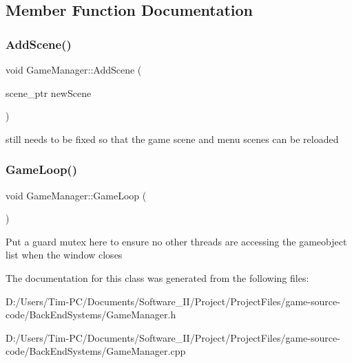 \subsection{Member Function Documentation}
\mbox{\label{class_game_manager_a65e593032333cee8723ad08ebfe897fc}} 
\subsubsection{\texorpdfstring{Add\+Scene()}{AddScene()}}
{\footnotesize\ttfamily void Game\+Manager\+::\+Add\+Scene (\begin{DoxyParamCaption}\item[{scene\+\_\+ptr}]{new\+Scene }\end{DoxyParamCaption})}

still needs to be fixed so that the game scene and menu scenes can be reloaded \mbox{\label{class_game_manager_a5baa570812ae717f809fe0dc48bde22e}} 
\subsubsection{\texorpdfstring{Game\+Loop()}{GameLoop()}}
{\footnotesize\ttfamily void Game\+Manager\+::\+Game\+Loop (\begin{DoxyParamCaption}{ }\end{DoxyParamCaption})}

Put a guard mutex here to ensure no other threads are accessing the gameobject list when the window closes 

The documentation for this class was generated from the following files\+:\begin{DoxyCompactItemize}
\item 
D\+:/\+Users/\+Tim-\/\+P\+C/\+Documents/\+Software\+\_\+\+I\+I/\+Project/\+Project\+Files/game-\/source-\/code/\+Back\+End\+Systems/Game\+Manager.\+h\item 
D\+:/\+Users/\+Tim-\/\+P\+C/\+Documents/\+Software\+\_\+\+I\+I/\+Project/\+Project\+Files/game-\/source-\/code/\+Back\+End\+Systems/Game\+Manager.\+cpp\end{DoxyCompactItemize}
